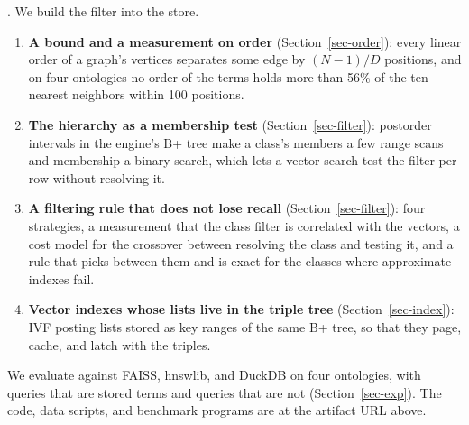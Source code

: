 .
We build the filter into the store.
\begin{enumerate}
\item \textbf{A bound and a measurement on order} (Section~\ref{sec-order}): every
  linear order of a graph's vertices separates some edge by $(N{-}1)/D$ positions,
  and on four ontologies no order of the terms holds more than 56\% of the ten
  nearest neighbors within 100 positions.
\item \textbf{The hierarchy as a membership test} (Section~\ref{sec-filter}):
  postorder intervals in the engine's B+ tree make a class's members a few range
  scans and membership a binary search, which lets a vector search test the filter
  per row without resolving it.
\item \textbf{A filtering rule that does not lose recall} (Section~\ref{sec-filter}):
  four strategies, a measurement that the class filter is correlated with the
  vectors, a cost model for the crossover between resolving the class and testing
  it, and a rule that picks between them and is exact for the classes where
  approximate indexes fail.
\item \textbf{Vector indexes whose lists live in the triple tree}
  (Section~\ref{sec-index}): IVF posting lists stored as key ranges of the same
  B+ tree, so that they page, cache, and latch with the triples.
\end{enumerate}
We evaluate against FAISS, hnswlib, and DuckDB on four ontologies, with queries that are
stored terms and queries that are not (Section~\ref{sec-exp}).
The code, data scripts, and benchmark programs are at the artifact URL above.
